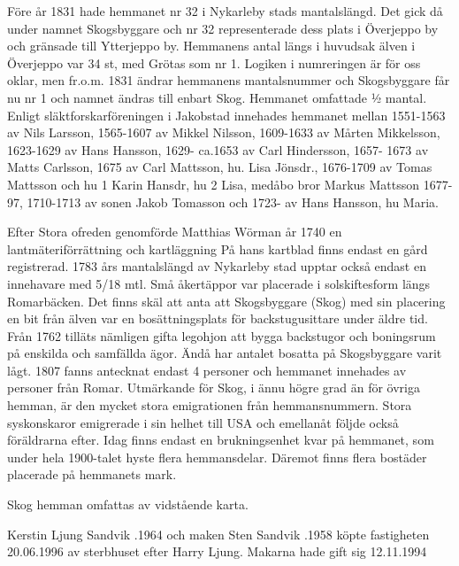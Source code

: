 
Före år 1831 hade hemmanet nr 32 i Nykarleby stads mantalslängd. Det gick då under namnet Skogsbyggare och nr 32 representerade dess plats i Överjeppo by och gränsade till Ytterjeppo by. Hemmanens antal längs i huvudsak älven i Överjeppo var 34 st, med Grötas som nr 1. Logiken i numreringen är för oss oklar, men fr.o.m. 1831 ändrar hemmanens mantalsnummer och Skogsbyggare får nu nr 1 och namnet ändras till enbart Skog. Hemmanet omfattade ½ mantal. Enligt släktforskarföreningen i Jakobstad innehades hemmanet mellan 1551-1563 av Nils Larsson, 1565-1607 av Mikkel Nilsson, 1609-1633 av Mårten Mikkelsson, 1623-1629 av Hans Hansson, 1629- ca.1653 av Carl Hindersson, 1657- 1673 av Matts Carlsson, 1675 av  Carl Mattsson, hu. Lisa Jönsdr., 1676-1709 av Tomas Mattsson och hu 1 Karin Hansdr, hu 2 Lisa, medåbo bror Markus Mattsson 1677-97, 1710-1713 av sonen Jakob Tomasson och 1723- av Hans Hansson, hu Maria.

Efter Stora ofreden genomförde Matthias Wörman år 1740 en lantmäteriförrättning och kartläggning På hans kartblad finns endast en gård registrerad. 1783 års mantalslängd av Nykarleby stad upptar också endast en innehavare med 5/18 mtl. Små åkertäppor var  placerade i solskiftesform längs Romarbäcken. Det finns skäl att anta att Skogsbyggare (Skog) med sin placering en bit från älven var en bosättningsplats för backstugusittare under äldre tid. Från 1762 tilläts nämligen gifta legohjon att bygga backstugor och boningsrum på enskilda och samfällda ägor. Ändå har antalet bosatta på Skogsbyggare varit lågt. 1807 fanns antecknat endast 4 personer och hemmanet innehades av personer från Romar.
Utmärkande för Skog, i ännu högre grad än för övriga hemman, är den mycket stora emigrationen från hemmansnummern. Stora syskonskaror emigrerade i sin helhet till USA och emellanåt följde också föräldrarna efter. Idag finns endast en brukningsenhet kvar på hemmanet, som under hela 1900-talet hyste flera hemmansdelar. Däremot finns flera bostäder placerade på hemmanets mark.

Skog hemman omfattas av vidstående karta.







Kerstin Ljung Sandvik .1964  och maken Sten Sandvik .1958 köpte fastigheten 20.06.1996 av sterbhuset efter Harry Ljung. Makarna hade gift sig 12.11.1994

